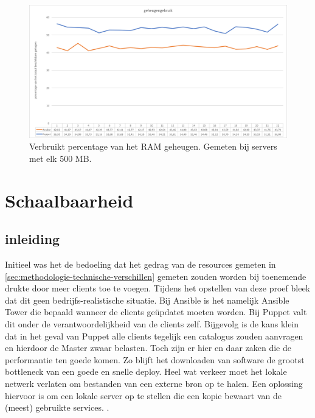 \begin{figure}
  \includegraphics[width=\linewidth]{img/geheugengebruik}
 \caption{Verbruikt percentage van het RAM geheugen. Gemeten bij servers met elk 500 MB. }  
  \label{fig:geheugengebruik}
\end{figure}


\section{Schaalbaarheid}
\label{sec:schaalbaarheid}

\subsection{inleiding}
\label{sec:inleiding}
 Initieel was het de bedoeling dat het gedrag van de resources gemeten in \ref{sec:methodologie-technische-verschillen} gemeten zouden worden bij toenemende drukte door meer clients toe te voegen. Tijdens het opstellen van deze proef bleek dat dit geen bedrijfs-realistische situatie. Bij Ansible is het namelijk Ansible Tower die bepaald wanneer de clients ge\"updatet moeten worden. Bij Puppet valt dit onder de verantwoordelijkheid van de clients zelf. Bijgevolg is de kans klein dat in het geval van Puppet alle clients tegelijk een catalogus zouden aanvragen en hierdoor de Master zwaar belasten. Toch zijn er hier en daar zaken die de performantie ten goede komen. Zo blijft het downloaden van software de grootst bottleneck van een goede en snelle deploy. Heel wat verkeer moet het lokale netwerk verlaten om bestanden van een externe bron op te halen. Een oplossing hiervoor is om een lokale server op te stellen die een kopie bewaart van de (meest) gebruikte services. \autocite{AnsibleTuning}.
 
